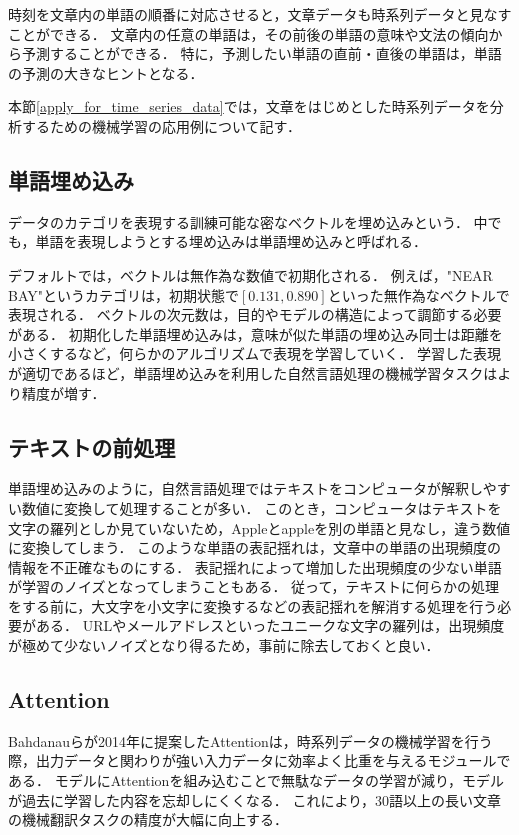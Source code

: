\documentclass[12pt,a4j]{jreport}
\begin{document}
時刻を文章内の単語の順番に対応させると，文章データも時系列データと見なすことができる．
文章内の任意の単語は，その前後の単語の意味や文法の傾向から予測することができる．
特に，予測したい単語の直前・直後の単語は，単語の予測の大きなヒントとなる．

本節\ref{apply_for_time_series_data}では，文章をはじめとした時系列データを分析するための機械学習の応用例について記す．

\subsection{単語埋め込み}
データのカテゴリを表現する訓練可能な密なベクトルを埋め込みという\cite{aurellen20}．
中でも，単語を表現しようとする埋め込みは単語埋め込みと呼ばれる．

デフォルトでは，ベクトルは無作為な数値で初期化される．
例えば，"NEAR BAY"というカテゴリは，初期状態で$[0.131, 0.890]$といった無作為なベクトルで表現される．
ベクトルの次元数は，目的やモデルの構造によって調節する必要がある．
初期化した単語埋め込みは，意味が似た単語の埋め込み同士は距離を小さくするなど，何らかのアルゴリズムで表現を学習していく．
学習した表現が適切であるほど，単語埋め込みを利用した自然言語処理の機械学習タスクはより精度が増す．

\subsection{テキストの前処理}
単語埋め込みのように，自然言語処理ではテキストをコンピュータが解釈しやすい数値に変換して処理することが多い．
このとき，コンピュータはテキストを文字の羅列としか見ていないため，Appleとappleを別の単語と見なし，違う数値に変換してしまう．
このような単語の表記揺れは，文章中の単語の出現頻度の情報を不正確なものにする．
表記揺れによって増加した出現頻度の少ない単語が学習のノイズとなってしまうこともある．
従って，テキストに何らかの処理をする前に，大文字を小文字に変換するなどの表記揺れを解消する処理を行う必要がある．
URLやメールアドレスといったユニークな文字の羅列は，出現頻度が極めて少ないノイズとなり得るため，事前に除去しておくと良い．


\subsection{Attention}
Bahdanauらが2014年に提案したAttentionは，時系列データの機械学習を行う際，出力データと関わりが強い入力データに効率よく比重を与えるモジュールである\cite{aurellen20}\cite{bahdanau_neural_2016}．
モデルにAttentionを組み込むことで無駄なデータの学習が減り，モデルが過去に学習した内容を忘却しにくくなる．
これにより，30語以上の長い文章の機械翻訳タスクの精度が大幅に向上する．
\end{document}
